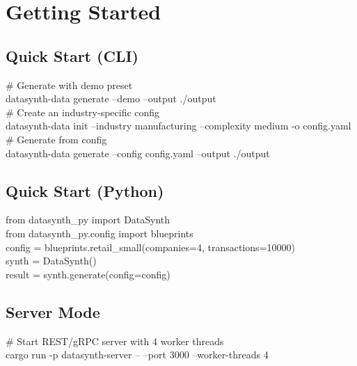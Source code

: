 \documentclass[11pt,a4paper]{article}
\begin{document}
\newpage
\section{Getting Started}

\subsection{Quick Start (CLI)}

\begin{tcolorbox}[colback=brand!3, colframe=brand!40, boxrule=0.5pt, arc=3pt,
                   left=8pt, right=8pt, top=6pt, bottom=6pt]
\ttfamily\small
\# Generate with demo preset\\
datasynth-data generate --demo --output ./output\\[6pt]
\# Create an industry-specific config\\
datasynth-data init --industry manufacturing --complexity medium -o config.yaml\\[6pt]
\# Generate from config\\
datasynth-data generate --config config.yaml --output ./output
\end{tcolorbox}

\subsection{Quick Start (Python)}

\begin{tcolorbox}[colback=brand!3, colframe=brand!40, boxrule=0.5pt, arc=3pt,
                   left=8pt, right=8pt, top=6pt, bottom=6pt]
\ttfamily\small
from datasynth\_py import DataSynth\\
from datasynth\_py.config import blueprints\\[6pt]
config = blueprints.retail\_small(companies=4, transactions=10000)\\
synth = DataSynth()\\
result = synth.generate(config=config)
\end{tcolorbox}

\subsection{Server Mode}

\begin{tcolorbox}[colback=brand!3, colframe=brand!40, boxrule=0.5pt, arc=3pt,
                   left=8pt, right=8pt, top=6pt, bottom=6pt]
\ttfamily\small
\# Start REST/gRPC server with 4 worker threads\\
cargo run -p datasynth-server -- --port 3000 --worker-threads 4
\end{tcolorbox}
\end{document}

